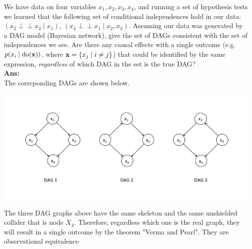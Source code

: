 \documentclass[11pt]{article}
\def\ci{\perp\!\!\!\perp}
\begin{document}
We have data on four variables $x_1, x_2, x_3, x_4$, and running a set of
hypothesis tests we learned that the following set of conditional
independences hold in our data:
$(x_2 \ci x_3 \mid x_1)$, $(x_4 \ci x_1 \mid x_2, x_3)$.  Assuming our data was
generated by a DAG model (Bayesian network), give the set of DAGs consistent
with the set of independences we see.  Are there any causal effects with a single outcome (e.g. $p(x_i \mid \text{do}({\bf x}))$, where ${\bf x} = \{ x_j \mid i \neq j \}$) that could be
identified by the same expression, \emph{regardless} of which DAG in the set is
the true DAG?\\
\textbf{Ans:}\\
The correponding DAGs are shown below.
\begin{center}
\includegraphics[scale=0.7]{DAG}
\end{center}
The three DAG graphs above have the same skeleton and the same unshielded collider that is node $X_4$. Therefore, regardless which one is the real graph, they will result in a single outcome by the theorem "Verma and Pearl". They are observational equivalence
\end{document}
